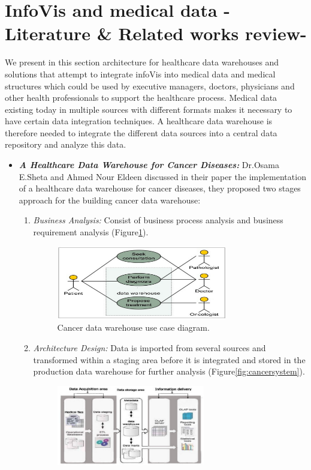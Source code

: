 \section{InfoVis and medical data -Literature \& Related works review-}
We present in this section architecture for healthcare data warehouses and solutions that attempt to integrate infoVis into medical data and medical structures which could be used by executive managers, doctors, physicians and other health professionals to support the healthcare process.  Medical data existing today in multiple sources with different formats makes it necessary to have certain data integration techniques. A healthcare data warehouse is therefore needed to integrate the different data sources into a central data repository and analyze this data.
\begin{itemize}
  \item \textbf{\textit{A Healthcare Data Warehouse for Cancer Diseases:}} Dr.Osama E.Sheta and Ahmed Nour Eldeen discussed in their paper\cite{shetaBuildingHealthCare2012} the implementation of a healthcare data warehouse for cancer diseases, they proposed  two stages approach for the building cancer data warehouse: 
  \begin{enumerate}
    \item \textit{Business Analysis:} Consist of business process analysis and business requirement analysis (Figure\ref{fig:cancerDiagrame}).
    \begin{figure}[h!]
      \center
      \includegraphics[width=0.75\textwidth]{images/chapter2/cancerDiagrame.PNG}
      \caption{Cancer data warehouse use case diagram.}
      \label{fig:cancerDiagrame}
    \end{figure}
    \newpage
    \item \textit{Architecture Design:} Data is imported from several sources and transformed within a staging area before it is integrated and stored in the production data warehouse for further analysis (Figure\ref{fig:cancersystem}).
     \begin{figure}[h!]
      \center
      \includegraphics[width=0.65\textwidth]{images/chapter2/cancersystem.PNG}

\end{figure}
\end{enumerate}
\end{itemize}
